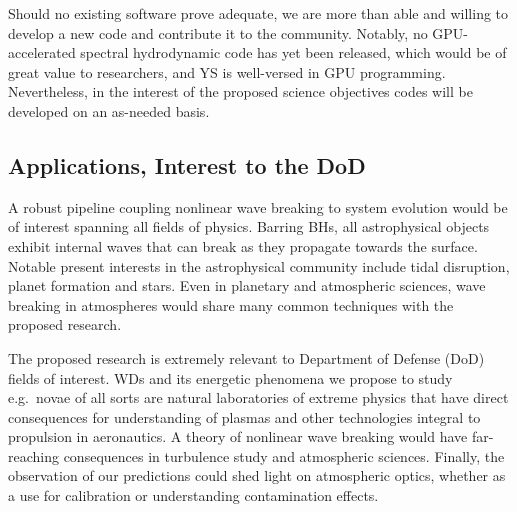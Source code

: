 \documentclass[11pt,
        usenames, %
        dvipsnames %
    ]{article}
\begin{document}
Should no existing software prove adequate, we are more than able and willing to
develop a new code and contribute it to the community. Notably, no
GPU-accelerated spectral hydrodynamic code has yet been released, which would be
of great value to researchers, and YS is well-versed in GPU programming.
Nevertheless, in the interest of the proposed science objectives codes will be
developed on an as-needed basis.

\subsection{Applications, Interest to the DoD}

A robust pipeline coupling nonlinear wave breaking to system evolution
would be of interest spanning all fields of physics. Barring BHs, all
astrophysical objects exhibit internal waves that can break as they propagate
towards the surface. Notable present interests in the astrophysical community
include tidal disruption, planet formation and stars. Even in planetary and
atmospheric sciences, wave breaking in atmospheres would share many common
techniques with the proposed research.

The proposed research is extremely relevant to Department of Defense (DoD)
fields of interest. WDs and its energetic phenomena we propose to study e.g.\
novae of all sorts are natural laboratories of extreme physics that have
direct consequences for understanding of plasmas and other technologies integral
to propulsion in aeronautics. A theory of nonlinear wave breaking would have
far-reaching consequences in turbulence study and atmospheric sciences. Finally,
the observation of our predictions could shed light on atmospheric optics,
whether as a use for calibration or understanding contamination effects.


\renewcommand{\bibname}{References}
{\scriptsize }
\end{document}
